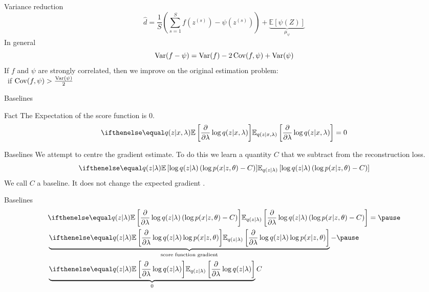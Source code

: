 \begin{frame}{Variance reduction}
\begin{equation*}
\hat d = \frac{1}{S} \left( \sum_{s=1}^S f(z^{(s)}) - \psi(z^{(s)})\right) + \underbrace{\mathbb E[\psi(Z)]}_{\mu_\psi}
\end{equation*}
In general
\begin{equation*}
\operatorname{Var}(f - \psi) = \operatorname{Var}(f) - 2\operatorname{Cov}(f, \psi) + \operatorname{Var}(\psi)
\end{equation*}
If $f$ and $\psi$ are strongly correlated, then we improve on the original estimation problem: \\
~if $\operatorname{Cov}(f, \psi) > \frac{\operatorname{Var}(\psi)}{2}$


\end{frame}

\begin{frame}{Baselines}
\begin{block}{Fact}
The Expectation of the score function is 0. 
\pause
\begin{equation*}
\E[q(z|x,\lambda)]{\pdv{\lambda} \log q(z|x,\lambda)} = 0
\end{equation*}
\end{block}
\end{frame}

\begin{frame}{Baselines}
We attempt to centre the gradient estimate. To do this we learn a quantity $ C $ that we subtract
from the reconstruction loss.
\begin{equation*}
\E[q(z|\lambda) ]{\log q(z|\lambda) \left( \log p(x|z,\theta) - C \right)}
\end{equation*}
We call $ C $ a baseline. It does not change the expected gradient \citep{Williams:1992}.
\end{frame}

\begin{frame}{Baselines}
 \begin{equation*}
\begin{aligned}
&\E[q(z|\lambda)]{\pdv{\lambda}\log q(z|\lambda) \left( \log p(x|z,\theta) - C \right)} = \pause \\
&\underbrace{\E[q(z|\lambda)]{\pdv{\lambda}\log q(z|\lambda)  \log p(x|z,\theta)}}_{\text{score function gradient}}  -
\pause \\
&\underbrace{\E[q(z|\lambda)]{\pdv{\lambda}\log q(z|\lambda)}}_{0}C
\end{aligned}
\end{equation*}
\end{frame}


